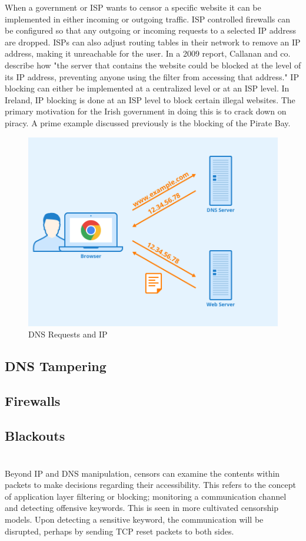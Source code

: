 When a government or ISP wants to censor a specific website it can be implemented in either incoming or outgoing traffic. ISP controlled firewalls can be configured so that any outgoing or incoming requests to a selected IP address are dropped. ISPs can also adjust routing tables in their network to remove an IP address, making it unreachable for the user. In a 2009 report, Callanan and co. describe how "the server that contains the website could be blocked at the level of its IP address, preventing anyone using the filter from accessing that address." \cite{inthemis2025internet} IP blocking can either be implemented at a centralized level or at an ISP level. In Ireland, IP blocking is done at an ISP level to block certain illegal websites. The primary motivation for the Irish government in doing this is to crack down on piracy. A prime example discussed previously is the blocking of the Pirate Bay. \cite{piratebay_block2013}

\begin{figure}
    \centering
    \includegraphics[width=0.5\linewidth]{State of the Art/DNS.png}
    \caption{DNS Requests and IP}
    \label{fig:enter-label}
\end{figure}






 
\subsection{DNS Tampering}

\subsection{Firewalls}

\subsection{Blackouts}


\section{}
Beyond IP and DNS manipulation, censors can examine the contents within packets to make decisions regarding their accessibility. This refers to the concept of application layer filtering or blocking; monitoring a communication channel and detecting offensive keywords. This is seen in more cultivated censorship models. Upon detecting a sensitive keyword, the communication will be disrupted, perhaps by sending TCP reset packets to both sides.

